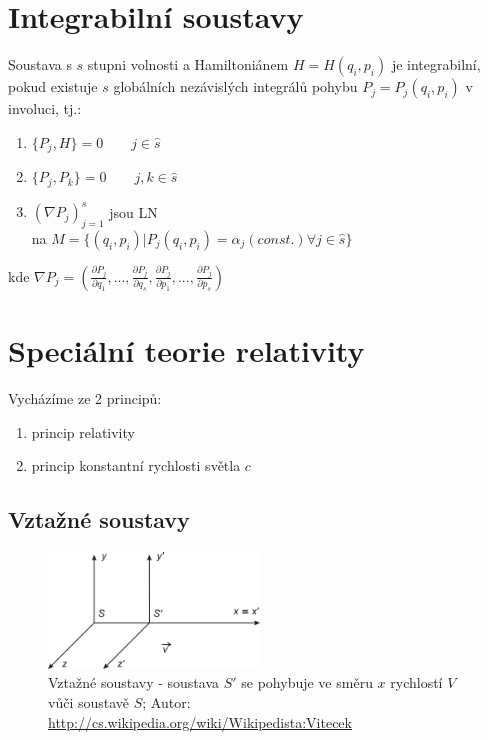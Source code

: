 \documentclass[a5paper,12pt]{article}
\begin{document}
\section{Integrabilní soustavy}

Soustava s $s$ stupni volnosti a Hamiltoniánem $H=H(q_i,p_i)$ je integrabilní, pokud existuje $s$ globálních nezávislých integrálů pohybu $P_j = P_j(q_i, p_i)$ v involuci, tj.:
\begin{enumerate}
	\item $\{P_j, H\} = 0 \qquad j \in \hat{s}$
	\item $\{P_j, P_k\} = 0 \qquad j,k \in \hat{s}$
	\item $(\nabla P_j)_{j=1}^{s}$ jsou LN\\ 
	na $M = \{(q_i, p_i) | P_j(q_i, p_i) = \alpha_j (const.) \forall j \in \hat{s} \}$
\end{enumerate}

\noindent kde $\nabla P_j = (\frac{\partial P_j}{\partial q_1}, ..., \frac{\partial P_j}{\partial q_s}, \frac{\partial P_j}{\partial p_1}, ..., \frac{\partial P_j}{\partial p_s})$

\section{Speciální teorie relativity}

Vycházíme ze 2 principů:
\begin{enumerate}
	\item princip relativity
	\item princip konstantní rychlosti světla $c$
\end{enumerate}

\subsection{Vztažné soustavy}

\begin{figure}[h!]
	\centering
	\includegraphics[width=0.5\textwidth]{data/Vztazna_soustava.png}
	\caption{Vztažné soustavy - soustava $S'$ se pohybuje ve směru $x$ rychlostí $V$ vůči soustavě $S$; Autor: \url{http://cs.wikipedia.org/wiki/Wikipedista:Vitecek}}
\end{figure}
\end{document}
